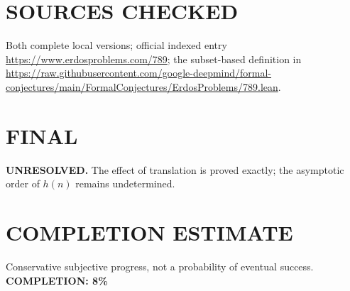 \section{SOURCES CHECKED}
Both complete local versions; official indexed entry \url{https://www.erdosproblems.com/789}; the subset-based definition in \url{https://raw.githubusercontent.com/google-deepmind/formal-conjectures/main/FormalConjectures/ErdosProblems/789.lean}.
\section{FINAL}
\textbf{UNRESOLVED.} The effect of translation is proved exactly; the asymptotic order of $h(n)$ remains undetermined.
\section{COMPLETION ESTIMATE}
Conservative subjective progress, not a probability of eventual success.
\textbf{COMPLETION: 8\%}
